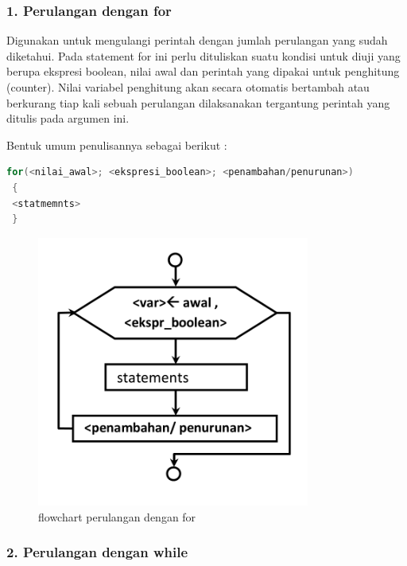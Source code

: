 \subsubsection{1. Perulangan dengan for}\label{perulangan-dengan-for}

Digunakan untuk mengulangi perintah dengan jumlah perulangan yang sudah
diketahui. Pada statement for ini perlu dituliskan suatu kondisi untuk
diuji yang berupa ekspresi boolean, nilai awal dan perintah yang dipakai
untuk penghitung (counter). Nilai variabel penghitung akan secara
otomatis bertambah atau berkurang tiap kali sebuah perulangan
dilaksanakan tergantung perintah yang ditulis pada argumen ini.

Bentuk umum penulisannya sebagai berikut :

\begin{lstlisting}[language=c++, numbers=none]
 for(<nilai_awal>; <ekspresi_boolean>; <penambahan/penurunan>)
 {
 <statmemnts>
 }
\end{lstlisting}

\begin{figure}[htbp]
\centering
\includegraphics[width=0.8\textwidth]{../manuscript/images/Capture2-8.PNG}
\caption{flowchart perulangan dengan for}
\end{figure}

\subsubsection{2. Perulangan dengan while}\label{perulangan-dengan-while}

